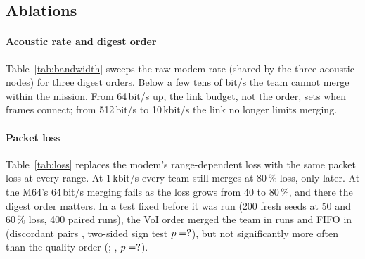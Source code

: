 \subsection{Ablations}
\paragraph{Acoustic rate and digest order}
Table~\ref{tab:bandwidth} sweeps the raw modem rate (shared by the three acoustic nodes) for
three digest orders. Below a few tens of bit/s the team cannot merge within the mission. From
64\,bit/s up, the link budget, not the order, sets when frames connect; from 512\,bit/s to
10\,kbit/s the link no longer limits merging.

\begin{table}[t]
  \centering
  \caption{Team merging vs.\ acoustic modem rate and digest order (reference fleet, harbor,
  600\,s, Tier-1 simulation). ``At'': median time at which the anchor's frame graph covers all
  four robots.}
  \label{tab:bandwidth}
  \scriptsize
  \setlength{\tabcolsep}{3pt}
\end{table}

\paragraph{Packet loss}
%
Table~\ref{tab:loss} replaces the modem's range-dependent loss with the same packet loss at
every range. At 1\,kbit/s every team still merges at 80\,\% loss, only later. At the M64's
64\,bit/s merging fails as the loss grows from 40 to 80\,\%, and there the digest order matters.
In a test fixed before it was run (200 fresh seeds at 50 and 60\,\% loss, 400 paired runs), the
VoI order merged the team in \lossConfirmVoi{} runs and FIFO in \lossConfirmFifo{} (discordant
pairs \lossConfirmVoiFifoPairs{}, two-sided sign test $p=?$), but not
significantly more often than the quality order (\lossConfirmQuality{}; \lossConfirmVoiQualityPairs{},
$p=?$).

\begin{table}[t]
  \centering
  \caption{Team merging vs.\ packet loss on the acoustic link (the same loss at every range),
  for two modem rates and three digest orders (reference fleet, harbor, 600\,s, Tier-1
  simulation): teams merged and, in parentheses, the median time [s] at which the anchor's
  frame graph covers all four robots.}
  \label{tab:loss}
  \scriptsize
  \setlength{\tabcolsep}{3pt}
\end{table}

